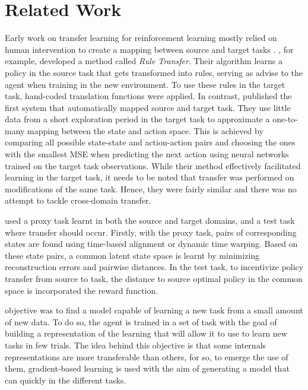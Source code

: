 \section{Related Work}
\label{sec:related-work}

Early work on transfer learning for reinforcement learning mostly relied on human intervention to create a mapping between source and target tasks \citep[e.g.][]{taylor2007cross}. \citet{taylor2007cross}, for example, developed a method called \textit{Rule Transfer}. Their algorithm learns a policy in the source task that gets transformed into rules, serving as advise to the agent when training in the new environment. To use these rules in the target task, hand-coded translation functions were applied. In contrast, \citet{taylor2008autonomous} published the first system that automatically mapped source and target task. They use little data from a short exploration period in the target task to approximate a one-to-many mapping between the state and action space. This is achieved by comparing all possible state-state and action-action pairs and choosing the ones with the smallest MSE when predicting the next action using neural networks trained on the target task observations. While their method effectively facilitated learning in the target task, it needs to be noted that transfer was performed on modifications of the same task. Hence, they were fairly similar and there was no attempt to tackle cross-domain transfer. 


\citet{gupta2017learning} used a proxy task learnt in both the source and target domains, and a test task where transfer should occur. Firstly, with the proxy task, pairs of corresponding states are found using time-based alignment or dynamic time warping. Based on these state pairs, a common latent state space is learnt by minimizing reconstruction errors and pairwise distances. In the test task, to incentivize policy transfer from source to task, the distance to source optimal policy in the common space is incorporated the reward function.

\cite{MAML} objective was to find a model capable of learning a new task from a small amount of new data. To do so, the agent is trained in a set of task with the goal of building a representation of the learning that will allow it to use to learn new tasks in few trials. The idea behind this objective is that some internals representations are more transferable than others, for so, to emerge the use of them, gradient-based learning is used with the aim of generating a model that can quickly in the different tasks.

